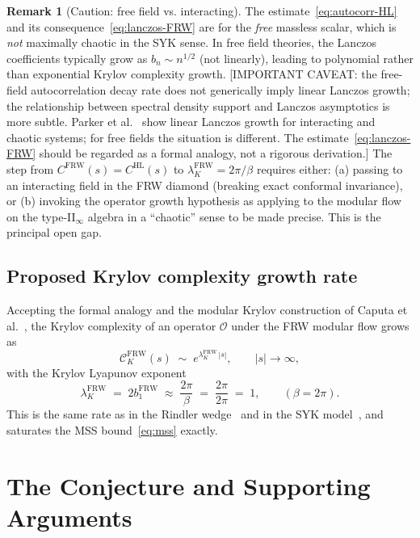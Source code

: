 \documentclass[12pt,a4paper]{article}
\theoremstyle{definition}
\newtheorem{remark}[theorem]{Remark}
\newcommand{\CK}{\mathcal{C}_K}
\newcommand{\lK}{\lambda_K}
\newcommand{\HL}{\mathrm{HL}}
\newcommand{\FRW}{\mathrm{FRW}}
\begin{document}
\begin{remark}[Caution: free field vs. interacting]
\label{rem:free-field}
The estimate~\eqref{eq:autocorr-HL} and its consequence~\eqref{eq:lanczos-FRW}
are for the \emph{free} massless scalar, which is \emph{not} maximally
chaotic in the SYK sense.
In free field theories, the Lanczos coefficients typically grow as
$b_n \sim n^{1/2}$ (not linearly), leading to polynomial rather than
exponential Krylov complexity growth.
[IMPORTANT CAVEAT: the free-field autocorrelation decay rate does not
generically imply linear Lanczos growth; the relationship between
spectral density support and Lanczos asymptotics is more subtle.
Parker et al.~\cite{Parker2019} show linear Lanczos growth for
interacting and chaotic systems; for free fields the situation is
different. The estimate~\eqref{eq:lanczos-FRW} should be regarded
as a formal analogy, not a rigorous derivation.]
The step from $C^\FRW(s) = C^\HL(s)$ to $\lK^\FRW = 2\pi/\beta$
requires either: (a) passing to an interacting field in the FRW
diamond (breaking exact conformal invariance), or (b) invoking the
operator growth hypothesis as applying to the modular flow on the
type-II$_\infty$ algebra in a ``chaotic'' sense to be made precise.
This is the principal open gap.
\end{remark}

\subsection{Proposed Krylov complexity growth rate}

Accepting the formal analogy and the modular Krylov construction of
Caputa et al.~\cite{Caputa2024}, the Krylov complexity of an operator
$\mathcal{O}$ under the FRW modular flow grows as
\begin{equation}
  \CK^\FRW(s) \;\sim\; e^{\lK^\FRW\,|s|},
  \qquad |s| \to \infty,
  \label{eq:Krylov-FRW-growth}
\end{equation}
with the Krylov Lyapunov exponent
\begin{equation}
  \lK^\FRW \;=\; 2b_1^\FRW \;\approx\; \frac{2\pi}{\beta}
  \;=\; \frac{2\pi}{2\pi} \;=\; 1,
  \qquad (\beta = 2\pi).
  \label{eq:Krylov-FRW-rate}
\end{equation}
This is the same rate as in the Rindler wedge~\cite{ModularShadow}
and in the SYK model~\cite{Parker2019, HPS2024}, and saturates the
MSS bound~\eqref{eq:mss} exactly.

\section{The Conjecture and Supporting Arguments}
\label{sec:conjecture}
\end{document}
